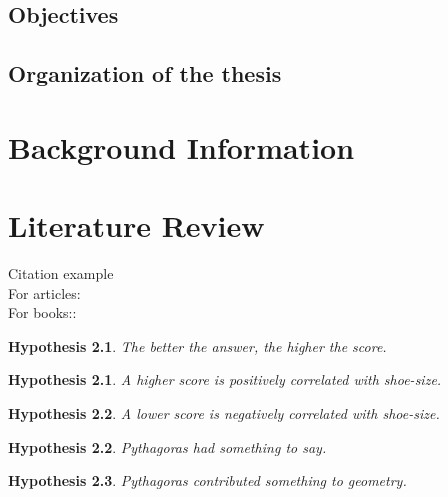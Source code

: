 \documentclass[a4paper, 12pt]{report}
\newtheorem{hyp}{Hypothesis}
\newtheorem{subhyp}{Hypothesis}
\begin{document}
    
    \section*{Objectives}
    
    \section*{Organization of the thesis}



\pagebreak \newpage

\chapter{Background Information} \label{sec:background}



\pagebreak \newpage

\chapter{Literature Review} \label{sec:literature}
    Citation example \\
     For articles: \citep{Blanchard19} \\
     For books::  \cite[see][chap 2]{latexcompanion}

    \begin{hyp}
        The better the answer, the higher the score.
    \end{hyp}
    
    \setcounter{subhyp}{0}
    \begin{subhyp}
        A higher score is positively correlated with shoe-size.
    \end{subhyp}
    
    \begin{subhyp}
        A lower score is negatively correlated with shoe-size.
    \end{subhyp}
    
    \begin{hyp}
        Pythagoras had something to say.
    \end{hyp}
    
    \setcounter{subhyp}{0} %
    \begin{subhyp}
        Pythagoras contributed something to geometry.
    \end{subhyp}
    
\end{document}
